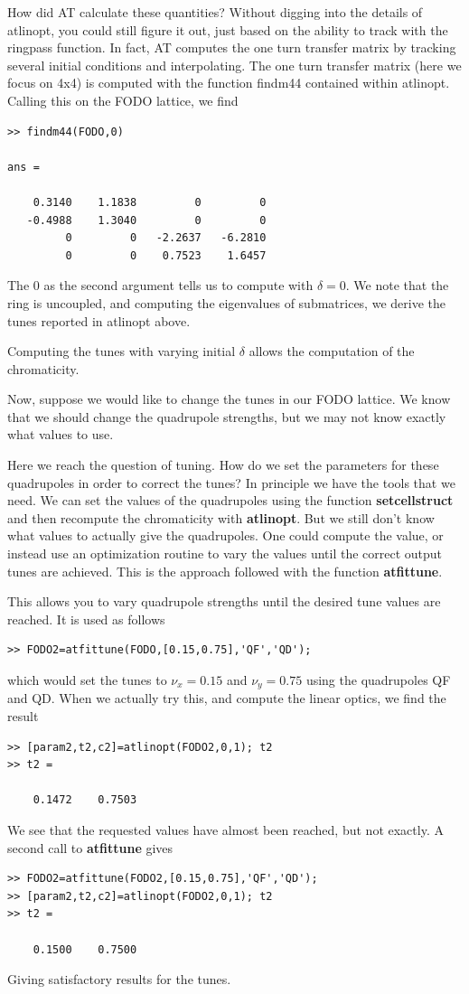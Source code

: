 \documentclass[acus]{article}
\newcommand{\mfun}[1]{{\bf{#1}}}
\begin{document}
How did AT calculate these quantities?  Without digging into the
details of atlinopt, you could still figure it out, just based on
the ability to track with the ringpass function.  In fact, AT computes
the one turn transfer matrix by tracking several initial conditions and
interpolating.  The one turn transfer matrix (here we focus on 4x4) is 
computed with the function findm44 contained within atlinopt.  
Calling this on the FODO lattice, we find
\begin{verbatim}
>> findm44(FODO,0)

ans =

    0.3140    1.1838         0         0
   -0.4988    1.3040         0         0
         0         0   -2.2637   -6.2810
         0         0    0.7523    1.6457
\end{verbatim}
The 0 as the second argument tells us to compute with $\delta=0$.
We note that the ring is uncoupled, and computing the eigenvalues of
submatrices, we derive the tunes reported in atlinopt above.

Computing the tunes with varying initial $\delta$ allows the 
computation of the chromaticity.  

Now, suppose we would like to change the tunes in our FODO lattice.  
We know that we should change the quadrupole strengths, but we may
not know exactly what values to use.

Here we reach the question of tuning.  How do we set the parameters for
these quadrupoles in order to correct the tunes?
In principle we have the tools that we need.  We can set the values
of the quadrupoles using the function \mfun{setcellstruct} and then
recompute the chromaticity with \mfun{atlinopt}.  But we still don't know what 
values to actually give the quadrupoles.  One could compute the
value, or instead use an optimization routine to vary the values
until the correct output tunes are achieved.  This is the
approach followed with the function \mfun{atfittune}.  

This allows you to vary quadrupole strengths until the desired tune
values are reached.  It is used as follows 
\begin{verbatim}
>> FODO2=atfittune(FODO,[0.15,0.75],'QF','QD');
\end{verbatim}
which would set the tunes to $\nu_x = 0.15$ and $\nu_y = 0.75$ using
the quadrupoles QF and QD. When we actually try this, and compute the
linear optics, we find the result
\begin{verbatim}
>> [param2,t2,c2]=atlinopt(FODO2,0,1); t2
>> t2 =

    0.1472    0.7503
\end{verbatim}
We see that the requested values have almost been reached, but not exactly.
A second call to \mfun{atfittune} gives
\begin{verbatim}
>> FODO2=atfittune(FODO2,[0.15,0.75],'QF','QD');
>> [param2,t2,c2]=atlinopt(FODO2,0,1); t2
>> t2 =

    0.1500    0.7500
\end{verbatim}
Giving satisfactory results for the tunes.
\end{document}
